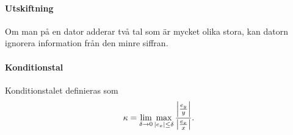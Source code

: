 \paragraph{Utskiftning}
Om man på en dator adderar två tal som är mycket olika stora, kan datorn ignorera information från den minre siffran.

\paragraph{Konditionstal}
Konditionstalet definieras som
\begin{align*}
	\kappa = \lim\limits_{\delta\to 0}\max\limits_{\abs{e_{x}} \leq \delta}\frac{\abs{\frac{e_{y}}{y}}}{\abs{\frac{e_{x}}{x}}}.
\end{align*}